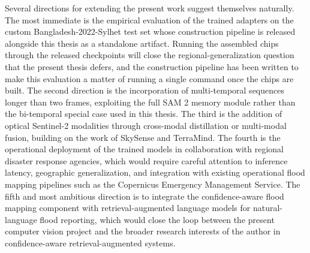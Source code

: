 \documentclass[11pt,a4paper,oneside]{report}
\begin{document}
Several directions for extending the present work suggest themselves naturally. The most immediate is the empirical evaluation of the trained adapters on the custom Bangladesh-2022-Sylhet test set whose construction pipeline is released alongside this thesis as a standalone artifact. Running the assembled chips through the released checkpoints will close the regional-generalization question that the present thesis defers, and the construction pipeline has been written to make this evaluation a matter of running a single command once the chips are built. The second direction is the incorporation of multi-temporal sequences longer than two frames, exploiting the full SAM 2 memory module rather than the bi-temporal special case used in this thesis. The third is the addition of optical Sentinel-2 modalities through cross-modal distillation or multi-modal fusion, building on the work of SkySense and TerraMind. The fourth is the operational deployment of the trained models in collaboration with regional disaster response agencies, which would require careful attention to inference latency, geographic generalization, and integration with existing operational flood mapping pipelines such as the Copernicus Emergency Management Service. The fifth and most ambitious direction is to integrate the confidence-aware flood mapping component with retrieval-augmented language models for natural-language flood reporting, which would close the loop between the present computer vision project and the broader research interests of the author in confidence-aware retrieval-augmented systems.
\end{document}
